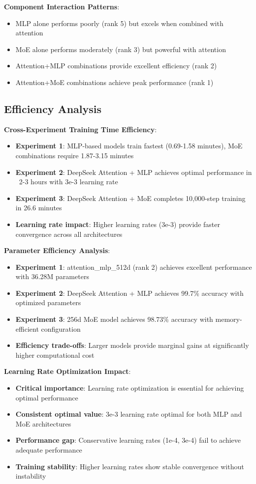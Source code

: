 \documentclass[11pt,a4paper]{article}
\begin{document}
\textbf{Component Interaction Patterns}:
\begin{itemize}
    \item MLP alone performs poorly (rank 5) but excels when combined with attention
    \item MoE alone performs moderately (rank 3) but powerful with attention
    \item Attention+MLP combinations provide excellent efficiency (rank 2)
    \item Attention+MoE combinations achieve peak performance (rank 1)
\end{itemize}

\subsection{Efficiency Analysis}

\textbf{Cross-Experiment Training Time Efficiency}:
\begin{itemize}
    \item \textbf{Experiment 1}: MLP-based models train fastest (0.69-1.58 minutes), MoE combinations require 1.87-3.15 minutes
    \item \textbf{Experiment 2}: DeepSeek Attention + MLP achieves optimal performance in ~2-3 hours with 3e-3 learning rate
    \item \textbf{Experiment 3}: DeepSeek Attention + MoE completes 10,000-step training in 26.6 minutes
    \item \textbf{Learning rate impact}: Higher learning rates (3e-3) provide faster convergence across all architectures
\end{itemize}

\textbf{Parameter Efficiency Analysis}:
\begin{itemize}
    \item \textbf{Experiment 1}: attention\_mlp\_512d (rank 2) achieves excellent performance with 36.28M parameters
    \item \textbf{Experiment 2}: DeepSeek Attention + MLP achieves 99.7\% accuracy with optimized parameters
    \item \textbf{Experiment 3}: 256d MoE model achieves 98.73\% accuracy with memory-efficient configuration
    \item \textbf{Efficiency trade-offs}: Larger models provide marginal gains at significantly higher computational cost
\end{itemize}

\textbf{Learning Rate Optimization Impact}:
\begin{itemize}
    \item \textbf{Critical importance}: Learning rate optimization is essential for achieving optimal performance
    \item \textbf{Consistent optimal value}: 3e-3 learning rate optimal for both MLP and MoE architectures
    \item \textbf{Performance gap}: Conservative learning rates (1e-4, 3e-4) fail to achieve adequate performance
    \item \textbf{Training stability}: Higher learning rates show stable convergence without instability
\end{itemize}
\end{document}
